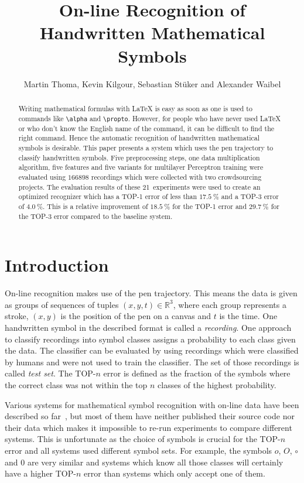 \documentclass[9pt,technote]{IEEEtran}
\title{On-line Recognition of Handwritten Mathematical Symbols}
\author{Martin Thoma, Kevin Kilgour, Sebastian St{\"u}ker and Alexander Waibel}
\begin{document}
\maketitle
\begin{abstract}
Writing mathematical formulas with \LaTeX{} is easy as soon as one is used to
commands like \verb+\alpha+ and \verb+\propto+. However, for people who have
never used \LaTeX{} or who don't know the English name of the command, it can
be difficult to find the right command. Hence the automatic recognition of
handwritten mathematical symbols is desirable. This paper presents a system
which uses the pen trajectory to classify handwritten symbols. Five
preprocessing steps, one data multiplication algorithm, five features and five
variants for multilayer Perceptron training were evaluated using $\num{166898}$
recordings which were collected with two crowdsourcing projects. The evaluation
results of these 21~experiments were used to create an optimized recognizer
which has a TOP-1 error of less than $\SI{17.5}{\percent}$ and a TOP-3 error of
$\SI{4.0}{\percent}$. This is a relative improvement of $\SI{18.5}{\percent}$ for the
TOP-1 error and $\SI{29.7}{\percent}$ for the TOP-3 error compared to the
baseline system.
\end{abstract}

\section{Introduction}
On-line recognition makes use of the pen trajectory. This means the data is
given as groups of sequences of tuples $(x, y, t) \in \mathbb{R}^3$, where each
group represents a stroke, $(x, y)$ is the position of the pen on a canvas and
$t$ is the time. One handwritten symbol in the described format is called a
\textit{recording}. One approach to classify recordings into symbol classes
assigns a probability to each class given the data. The classifier can be
evaluated by using recordings which were classified by humans and were not used
to train the classifier. The set of those recordings is called \textit{test
set}. The TOP-$n$ error is defined as the fraction of the symbols where
the correct class was not within the top $n$ classes of the highest
probability.

Various systems for mathematical symbol recognition with on-line data have been
described so far~\cite{Kosmala98,Mouchere2013}, but most of them have neither
published their source code nor their data which makes it impossible to re-run
experiments to compare different systems. This is unfortunate as the choice of
symbols is crucial for the TOP-$n$ error and all systems used different symbol
sets. For example, the symbols $o$, $O$, $\circ$ and $0$ are very similar and
systems which know all those classes will certainly have a higher TOP-$n$ error
than systems which only accept one of them.
\end{document}

